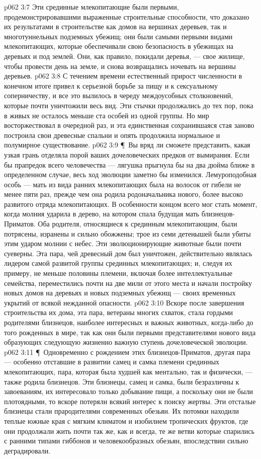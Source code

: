 \vs p062 3:7 Эти срединные млекопитающие были первыми, продемонстрировавшими выраженные строительные способности, что доказано их результатами в строительстве как домов на вершинах деревьев, так и многотуннельных подземных убежищ; они были самыми первыми видами млекопитающих, которые обеспечивали свою безопасность в убежищах на деревьях и под землей. Они, как правило, покидали деревья, --- свое жилище, чтобы провести день на земле, и снова возвращались ночевать на вершины деревьев.
\vs p062 3:8 С течением времени естественный прирост численности в конечном итоге привел к серьезной борьбе за пищу и к сексуальному соперничеству, и все это вылилось в череду междоусобных столкновений, которые почти уничтожили весь вид. Эти стычки продолжались до тех пор, пока в живых не осталось меньше ста особей из одной группы. Но мир восторжествовал в очередной раз, и эта единственная сохранившаяся стая заново построила свои древесные спальни и опять продолжила нормальное и полумирное существование.
\vs p062 3:9 \P\ Вы вряд ли сможете представить, какая узкая грань отделяла порой ваших дочеловеческих предков от вымирания. Если бы прапредок всего человечества --- лягушка прыгнула бы на два дюйма ближе в определенном случае, весь ход эволюции заметно бы изменился. Лемуроподобная особь --- мать из вида ранних млекопитающих была на волосок от гибели не менее пяти раз, прежде чем она родила родоначальника нового, более высоко развитого отряда млекопитающих. В особенности концом всего мог стать момент, когда молния ударила в дерево, на котором спала будущая мать близнецов\hyp{}Приматов. Оба родителя, относящиеся к срединным млекопитающим, были потрясены, изранены и сильно обожжены; трое из семи детенышей были убиты этим ударом молнии с небес. Эти эволюционирующие животные были почти суеверны. Эта пара, чей древесный дом был уничтожен, действительно являлась лидером самой развитой группы срединных млекопитающих; и, следуя их примеру, не меньше половины племени, включая более интеллектуальные семейства, переместились почти на две мили от этого места и начали постройку новых домов на деревьях и новых подземных убежищ --- своих временных укрытий от всякой нежданной опасности.
\vs p062 3:10 Вскоре после завершения строительства их дома, эта пара, ветераны многих схваток, стала гордыми родителями близнецов, наиболее интересных и важных животных, когда\hyp{}либо до того рожденных в мире, так как они были первыми представителями нового вида  образующих следующую жизненно важную ступень дочеловеческой эволюции.
\vs p062 3:11 \P\ Одновременно с рождением этих близнецов\hyp{}Приматов, другая пара --- особенно отставшие в развитии самец и самка племени срединных млекопитающих, пара, которая была худшей как ментально, так и физически, --- также родила близнецов. Эти близнецы, самец и самка, были безразличны к завоеваниям, их интересовало только добывание пищи, а поскольку они не были плотоядными, то вскоре потеряли всякий интерес к поиску жертвы. Эти отсталые близнецы стали прародителями современных обезьян. Их потомки находили теплые южные края с мягким климатом и изобилием тропических фруктов, где они продолжали жить почти так же, как и всегда, те же ветви которые спарились с ранними типами гиббонов и человекообразных обезьян, впоследствии сильно деградировали.
